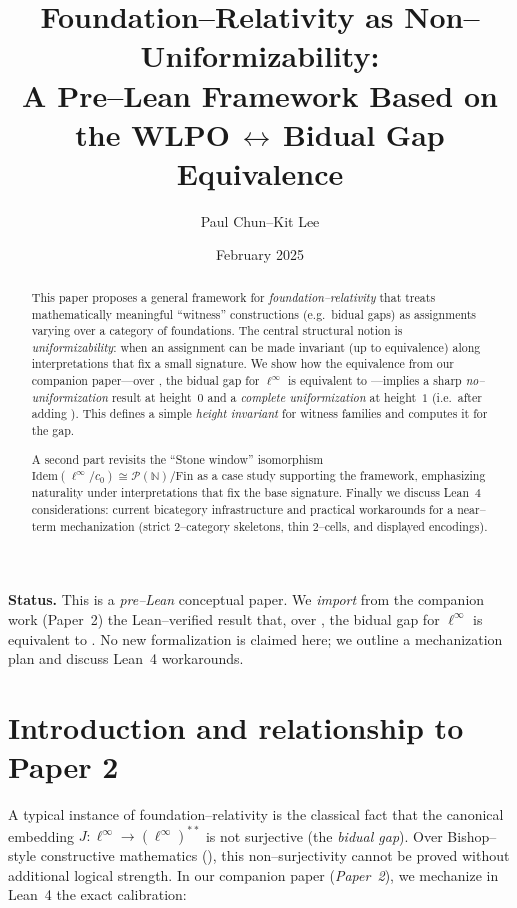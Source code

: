 \documentclass[11pt]{article}
\title{Foundation--Relativity as Non--Uniformizability:\\
A Pre--Lean Framework Based on the WLPO\,$\boldsymbol{\leftrightarrow}$\,Bidual Gap Equivalence}
\author{Paul Chun--Kit Lee}
\date{February 2025}
\theoremstyle{definition}
\theoremstyle{remark}
\newcommand{\N}{\mathbb{N}}
\newcommand{\cnull}{c_0}
\newcommand{\linf}{\ell^\infty}
\newcommand{\WLPO}{\mathrm{WLPO}}
\newcommand{\BISH}{\mathrm{BISH}}
\begin{document}
\maketitle

\begin{abstract}
This paper proposes a general framework for \emph{foundation--relativity} that treats mathematically meaningful ``witness'' constructions (e.g.\ bidual gaps) as assignments varying over a category of foundations. The central structural notion is \emph{uniformizability}: when an assignment can be made invariant (up to equivalence) along interpretations that fix a small signature. We show how the equivalence from our companion paper---over \BISH, the bidual gap for $\linf$ is equivalent to \WLPO---implies a sharp \emph{no--uniformization} result at height~$0$ and a \emph{complete uniformization} at height~$1$ (i.e.\ after adding \WLPO). This defines a simple \emph{height invariant} for witness families and computes it for the gap.

A second part revisits the ``Stone window'' isomorphism $\mathrm{Idem}(\linf/\cnull)\cong\mathcal{P}(\N)/\mathrm{Fin}$ as a case study supporting the framework, emphasizing naturality under interpretations that fix the base signature. Finally we discuss Lean~4 considerations: current bicategory infrastructure and practical workarounds for a near--term mechanization (strict $2$--category skeletons, thin $2$--cells, and displayed encodings).
\end{abstract}

\begin{mdframed}[style=status]
\textbf{Status.} This is a \emph{pre--Lean} conceptual paper. We \emph{import} from the companion work (Paper~2) the Lean--verified result that, over \BISH, the bidual gap for $\linf$ is equivalent to \WLPO. No new formalization is claimed here; we outline a mechanization plan and discuss Lean~4 workarounds.
\end{mdframed}

\tableofcontents

\section{Introduction and relationship to Paper 2}

A typical instance of foundation--relativity is the classical fact that the canonical embedding $J:\linf\to(\linf)^{**}$ is not surjective (the \emph{bidual gap}). Over Bishop--style constructive mathematics (\BISH), this non--surjectivity cannot be proved without additional logical strength. In our companion paper (\emph{Paper~2}), we mechanize in Lean~4 the exact calibration:
\end{document}
